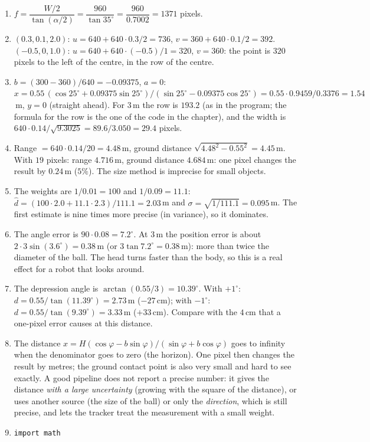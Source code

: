 \begin{enumerate}[label=\textbf{\ansnum.\arabic*}]
  \item $f=\dfrac{W/2}{\tan(\alpha/2)}=\dfrac{960}{\tan35^{\circ}}=\dfrac{960}{0.7002}=1371$ pixels.
  \item $(0.3,0.1,2.0)$: $u=640+640\cdot0.3/2=736$, $v=360+640\cdot0.1/2=392$. $(-0.5,0,1.0)$: $u=640+640\cdot(-0.5)/1=320$, $v=360$: the point is $320$ pixels to the left of the centre, in the row of the centre.
  \item $b=(300-360)/640=-0.09375$, $a=0$: $x=0.55\,(\cos25^{\circ}+0.09375\sin25^{\circ})/(\sin25^{\circ}-0.09375\cos25^{\circ})=0.55\cdot0.9459/0.3376=1.54$\,m, $y=0$ (straight ahead). For $3$\,m the row is $193.2$ (as in the program; the formula for the row is the one of the code in the chapter), and the width is $640\cdot0.14/\sqrt{9.3025}=89.6/3.050=29.4$ pixels.
  \item Range $=640\cdot0.14/20=4.48$\,m, ground distance $\sqrt{4.48^2-0.55^2}=4.45$\,m. With $19$ pixels: range $4.716$\,m, ground distance $4.684$\,m: one pixel changes the result by $0.24$\,m ($5\%$). The size method is imprecise for small objects.
  \item The weights are $1/0.01=100$ and $1/0.09=11.1$: $\hat d=(100\cdot2.0+11.1\cdot2.3)/111.1=2.03$\,m and $\sigma=\sqrt{1/111.1}=0.095$\,m. The first estimate is nine times more precise (in variance), so it dominates.
  \item The angle error is $90\cdot0.08=7.2^{\circ}$. At $3$\,m the position error is about $2\cdot3\sin(3.6^{\circ})=0.38$\,m (or $3\tan7.2^{\circ}=0.38$\,m): more than twice the diameter of the ball. The head turns faster than the body, so this is a real effect for a robot that looks around.
  \item The depression angle is $\arctan(0.55/3)=10.39^{\circ}$. With $+1^{\circ}$: $d=0.55/\tan(11.39^{\circ})=2.73$\,m ($-27$\,cm); with $-1^{\circ}$: $d=0.55/\tan(9.39^{\circ})=3.33$\,m ($+33$\,cm). Compare with the $4$\,cm that a one-pixel error causes at this distance.
  \item The distance $x=H(\cos\varphi-b\sin\varphi)/(\sin\varphi+b\cos\varphi)$ goes to infinity when the denominator goes to zero (the horizon). One pixel then changes the result by metres; the ground contact point is also very small and hard to see exactly. A good pipeline does not report a precise number: it gives the distance \emph{with a large uncertainty} (growing with the square of the distance), or uses another source (the size of the ball) or only the \emph{direction}, which is still precise, and lets the tracker treat the measurement with a small weight.
  \item
\begin{verbatim}
import math


\end{verbatim}
\end{enumerate}
